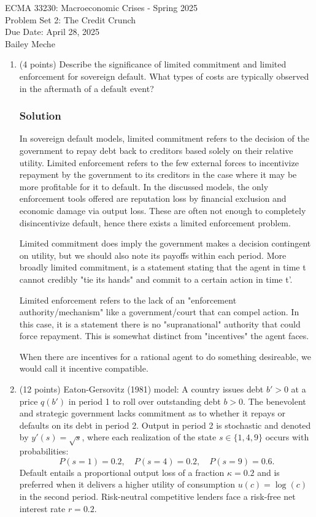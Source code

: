 \documentclass[12pt]{article}
\begin{document}
	\begin{center}
		ECMA 33230: Macroeconomic Crises - Spring 2025\\
        Problem Set 2: The Credit Crunch \\
		Due Date: April 28, 2025 \\
        Bailey Meche
	\end{center}

\begin{enumerate}
        \item (4 points) Describe the significance of limited commitment and limited enforcement for sovereign default. What types of costs are typically observed in the aftermath of a default event?
    \subsubsection*{Solution}

    In sovereign default models, limited commitment refers to the decision of the government to repay debt back to creditors based solely on their relative utility. Limited enforcement refers to the few external forces to incentivize repayment by the government to its creditors in the case where it may be more profitable for it to default. In the discussed models, the only enforcement tools offered are reputation loss by financial exclusion and economic damage via output loss. These are often not enough to completely disincentivize default, hence there exists a limited enforcement problem. 

Limited commitment does imply the government makes a decision contingent on utility, but we should also note its payoffs within each period. More broadly limited commitment, is a statement stating that the agent in time t cannot credibly "tie its hands" and commit to a certain action in time t'.

Limited enforcement refers to the lack of an "enforcement authority/mechanism" like a government/court that can compel action. In this case, it is a statement there is no "supranational" authority that could force repayment. This is somewhat distinct from "incentives" the agent faces.

When there are incentives for a rational agent to do something desireable, we would call it incentive compatible.
    
    \item (12 points) {Eaton-Gersovitz (1981) model:} A country issues debt $b' > 0$ at a price $q(b')$ in period 1 to roll over outstanding debt $b > 0$. The benevolent and strategic government lacks commitment as to whether it repays or defaults on its debt in period 2. Output in period 2 is stochastic and denoted by $y'(s) = \sqrt{s}$, where each realization of the state $s \in \{1, 4, 9\}$ occurs with probabilities:
    \[
    P(s=1) = 0.2, \quad P(s=4) = 0.2, \quad P(s=9) = 0.6.
    \]
    Default entails a proportional output loss of a fraction $\kappa = 0.2$ and is preferred when it delivers a higher utility of consumption $u(c) = \log(c)$ in the second period. Risk-neutral competitive lenders face a risk-free net interest rate $r = 0.2$.


\end{enumerate}
\end{document}
